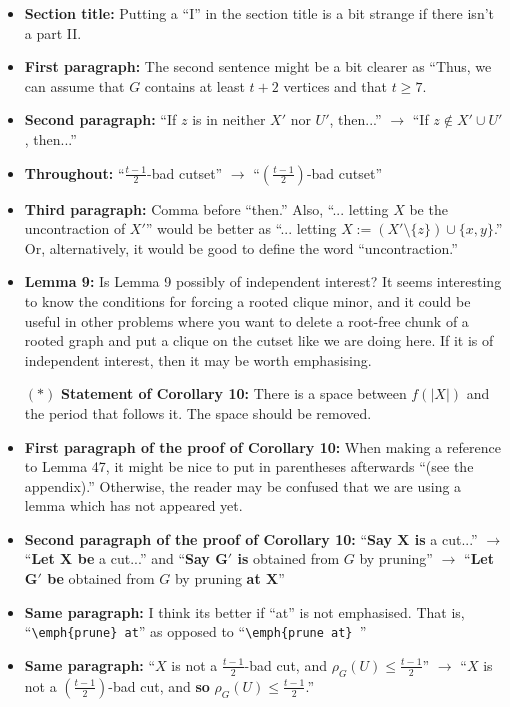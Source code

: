 \documentclass[11 pt]{article}
\begin{document}
\begin{itemize}
\item \textbf{Section title:} Putting a ``I'' in the section title is a bit strange if there isn't a part II. 
\item \textbf{First paragraph:} The second sentence might be a bit clearer as ``Thus, we can assume that $G$ contains at least $t+2$ vertices and that $t\geq7$. 
\item \textbf{Second paragraph:} ``If $z$ is in neither $X'$ nor $U'$, then...'' $\to$ ``If $z\notin X'\cup U'$, then...''
\item \textbf{Throughout:} ``$\frac{t-1}{2}$-bad cutset'' $\to$ ``$\left(\frac{t-1}{2}\right)$-bad cutset''
\item \textbf{Third paragraph:} Comma before ``then.'' Also, ``... letting $X$ be the uncontraction of $X'$'' would be better as ``... letting $X:=(X'\setminus \{z\})\cup\{x,y\}$.'' Or, alternatively, it would be good to define the word ``uncontraction.''
\item \textbf{Lemma 9:} Is Lemma 9 possibly of independent interest? It seems interesting to know the conditions for forcing a rooted clique minor, and it could be useful in other problems where you want to delete a root-free chunk of a rooted graph and put a clique on the cutset like we are doing here. If it is of independent interest, then it may be worth emphasising. 
\item[$\boldsymbol{(*)}$] \textbf{Statement of Corollary 10:} There is a space between $f(|X|)$ and the period that follows it. The space should be removed. 
\item \textbf{First paragraph of the proof of Corollary 10:} When making a reference to Lemma 47, it might be nice to put in parentheses afterwards ``(see the appendix).'' Otherwise, the reader may be confused that we are using a lemma which has not appeared yet.
\item \textbf{Second paragraph of the proof of Corollary 10:} ``\textbf{Say $\boldsymbol{X}$ is} a cut...'' $\to$ ``\textbf{Let $\boldsymbol{X}$ be} a cut...'' and ``\textbf{Say $\boldsymbol{G'}$ is} obtained from $G$ by pruning'' $\to$ ``\textbf{Let $\boldsymbol{G'}$ be} obtained from $G$ by pruning \textbf{at $\boldsymbol{X}$}''
\item \textbf{Same paragraph:} I think its better if ``at'' is not emphasised. That is, ``\texttt{\textbackslash{emph\{prune\}} at}'' as opposed to ``\texttt{\textbackslash{emph\{prune at\}} }''
\item \textbf{Same paragraph:} ``$X$ is not a $\frac{t-1}{2}$-bad cut, and $\rho_G(U)\leq \frac{t-1}{2}$'' $\to$ ``$X$ is not a $\left(\frac{t-1}{2}\right)$-bad cut, and \textbf{so} $\rho_G(U)\leq \frac{t-1}{2}$.'' 

\end{itemize}
\end{document}
